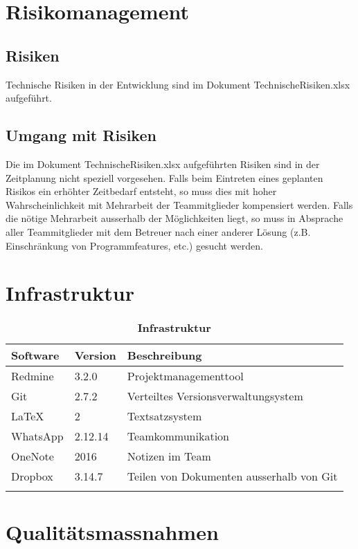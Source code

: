 \documentclass[a4,12pt]{scrartcl}
\begin{document}
\section{Risikomanagement}
\subsection{Risiken}
Technische Risiken in der Entwicklung sind im Dokument TechnischeRisiken.xlsx aufgeführt.
\subsection{Umgang mit Risiken}
Die im Dokument TechnischeRisiken.xlsx aufgeführten Risiken sind in der Zeitplanung nicht speziell vorgesehen. Falls beim Eintreten eines geplanten Risikos ein erhöhter Zeitbedarf entsteht, so muss dies mit hoher Wahrscheinlichkeit mit Mehrarbeit der Teammitglieder kompensiert werden. Falls die nötige Mehrarbeit ausserhalb der Möglichkeiten liegt, so muss in Absprache aller Teammitglieder mit dem Betreuer nach einer anderer Lösung (z.B. Einschränkung von Programmfeatures, etc.) gesucht werden.

\section{Infrastruktur}
\begin{table}[H]
\centering
    \begin{tabular}{@{} l l p{9cm} @{}}\toprule    
    {Software} & {Version} & {Beschreibung}\\ \midrule
    Redmine & 3.2.0 & Projektmanagementtool\\ \addlinespace
    Git & 2.7.2 & Verteiltes Versionsverwaltungsystem \\ \addlinespace
    \LaTeX & 2 & Textsatzsystem \\ \addlinespace
    WhatsApp & 2.12.14 & Teamkommunikation \\ \addlinespace
    OneNote & 2016 & Notizen im Team \\ \addlinespace
    Dropbox & 3.14.7 & Teilen von Dokumenten ausserhalb von Git \\ \addlinespace
    \bottomrule
    \end{tabular}
\caption{\textbf{Infrastruktur}}
\end{table}


\section{Qualitätsmassnahmen}
\end{document}
